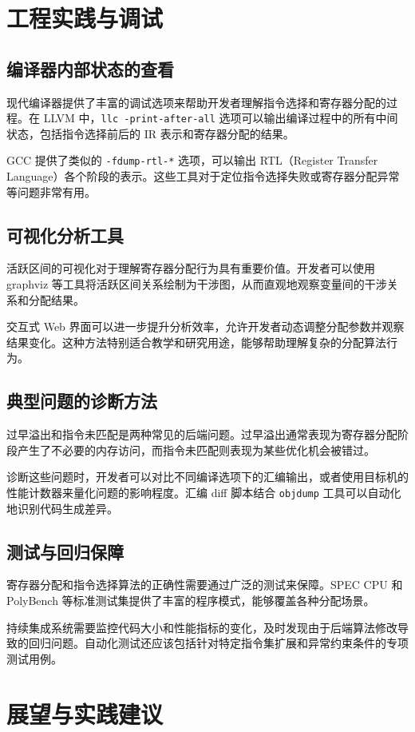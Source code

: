\chapter{工程实践与调试}
\section{编译器内部状态的查看}
现代编译器提供了丰富的调试选项来帮助开发者理解指令选择和寄存器分配的过程。在 LLVM 中，\texttt{llc -print-after-all} 选项可以输出编译过程中的所有中间状态，包括指令选择前后的 IR 表示和寄存器分配的结果。\par
GCC 提供了类似的 \texttt{-fdump-rtl-*} 选项，可以输出 RTL（Register Transfer Language）各个阶段的表示。这些工具对于定位指令选择失败或寄存器分配异常等问题非常有用。\par
\section{可视化分析工具}
活跃区间的可视化对于理解寄存器分配行为具有重要价值。开发者可以使用 graphviz 等工具将活跃区间关系绘制为干涉图，从而直观地观察变量间的干涉关系和分配结果。\par
交互式 Web 界面可以进一步提升分析效率，允许开发者动态调整分配参数并观察结果变化。这种方法特别适合教学和研究用途，能够帮助理解复杂的分配算法行为。\par
\section{典型问题的诊断方法}
过早溢出和指令未匹配是两种常见的后端问题。过早溢出通常表现为寄存器分配阶段产生了不必要的内存访问，而指令未匹配则表现为某些优化机会被错过。\par
诊断这些问题时，开发者可以对比不同编译选项下的汇编输出，或者使用目标机的性能计数器来量化问题的影响程度。汇编 diff 脚本结合 \texttt{objdump} 工具可以自动化地识别代码生成差异。\par
\section{测试与回归保障}
寄存器分配和指令选择算法的正确性需要通过广泛的测试来保障。SPEC CPU 和 PolyBench 等标准测试集提供了丰富的程序模式，能够覆盖各种分配场景。\par
持续集成系统需要监控代码大小和性能指标的变化，及时发现由于后端算法修改导致的回归问题。自动化测试还应该包括针对特定指令集扩展和异常约束条件的专项测试用例。\par
\chapter{展望与实践建议}
